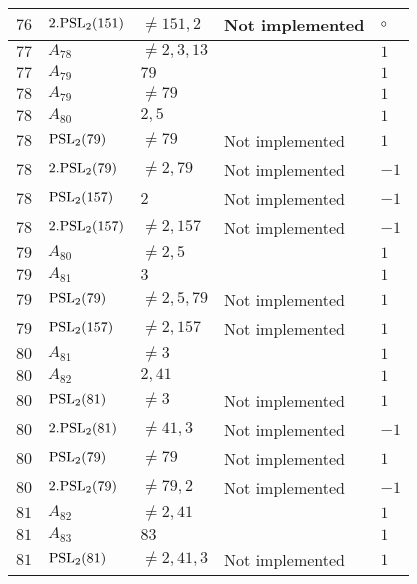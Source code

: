 \documentclass[a4paper, 11pt]{article}
\begin{document}
\begin{longtable}{lllll}
        $ 76 $ & $ 2.{\rm PSL}_{2}(151) $ & $ \neq 151, 2 $ & Not implemented & $\circ$ \\ \hline
        $ 77 $ & $ A_{78} $ & $ \neq 2, 3, 13 $ & $ ~ $ & $ 1  $ \\ \hline
        $ 77 $ & $ A_{79} $ & $ 79 $ & $ ~ $ & $ 1  $ \\ \hline
        $ 78 $ & $ A_{79} $ & $ \neq 79 $ & $ ~ $ & $ 1  $ \\ \hline
        $ 78 $ & $ A_{80} $ & $ 2, 5 $ & $ ~ $ & $ 1  $ \\ \hline
        $ 78 $ & $ {\rm PSL}_{2}(79) $ & $ \neq 79 $ & Not implemented & $ 1  $ \\ \hline
        $ 78 $ & $ 2.{\rm PSL}_{2}(79) $ & $ \neq 2, 79 $ & Not implemented & $ -1  $ \\ \hline
        $ 78 $ & $ {\rm PSL}_{2}(157) $ & $ 2 $ & Not implemented & $ -1  $ \\ \hline
        $ 78 $ & $ 2.{\rm PSL}_{2}(157) $ & $ \neq 2, 157 $ & Not implemented & $ -1  $ \\ \hline
        $ 79 $ & $ A_{80} $ & $ \neq 2, 5 $ & $ ~ $ & $ 1  $ \\ \hline
        $ 79 $ & $ A_{81} $ & $ 3 $ & $ ~ $ & $ 1  $ \\ \hline
        $ 79 $ & $ {\rm PSL}_{2}(79) $ & $ \neq 2, 5, 79 $ & Not implemented & $ 1  $ \\ \hline
        $ 79 $ & $ {\rm PSL}_{2}(157) $ & $ \neq 2, 157 $ & Not implemented & $ 1  $ \\ \hline
        $ 80 $ & $ A_{81} $ & $ \neq 3 $ & $ ~ $ & $ 1  $ \\ \hline
        $ 80 $ & $ A_{82} $ & $ 2, 41 $ & $ ~ $ & $ 1  $ \\ \hline
        $ 80 $ & $ {\rm PSL}_{2}(81) $ & $ \neq 3 $ & Not implemented & $ 1  $ \\ \hline
        $ 80 $ & $ 2.{\rm PSL}_{2}(81) $ & $ \neq 41, 3 $ & Not implemented & $ -1  $ \\ \hline
        $ 80 $ & $ {\rm PSL}_{2}(79) $ & $ \neq 79 $ & Not implemented & $ 1  $ \\ \hline
        $ 80 $ & $ 2.{\rm PSL}_{2}(79) $ & $ \neq 79, 2 $ & Not implemented & $ -1  $ \\ \hline
        $ 81 $ & $ A_{82} $ & $ \neq 2, 41 $ & $ ~ $ & $ 1  $ \\ \hline
        $ 81 $ & $ A_{83} $ & $ 83 $ & $ ~ $ & $ 1  $ \\ \hline
        $ 81 $ & $ {\rm PSL}_{2}(81) $ & $ \neq 2, 41, 3 $ & Not implemented & $ 1  $ \\ \hline

\end{longtable}
\end{document}
